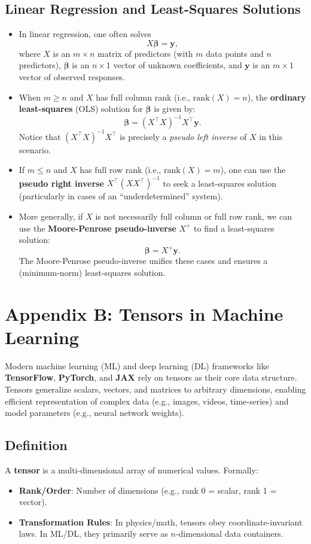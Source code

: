 \documentclass[12pt]{article}
\begin{document}
\subsection*{Linear Regression and Least-Squares Solutions}
\begin{itemize}
    \item In linear regression, one often solves
    \[
        X \boldsymbol{\beta} = \mathbf{y},
    \]
    where $X$ is an $m \times n$ matrix of predictors (with $m$ data points and $n$ predictors), $\boldsymbol{\beta}$ is an $n \times 1$ vector of unknown coefficients, and $\mathbf{y}$ is an $m \times 1$ vector of observed responses.
    \item When $m \ge n$ and $X$ has full column rank (i.e., $\mathrm{rank}(X)=n$), the \textbf{ordinary least-squares} (OLS) solution for $\boldsymbol{\beta}$ is given by:
    \[
        \boldsymbol{\beta} = (X^\top X)^{-1} X^\top \mathbf{y}.
    \]
    Notice that $(X^\top X)^{-1} X^\top$ is precisely a \emph{pseudo left inverse} of $X$ in this scenario.
    \item If $m \le n$ and $X$ has full row rank (i.e., $\mathrm{rank}(X)=m$), one can use the \textbf{pseudo right inverse} $X^\top (X X^\top)^{-1}$ to seek a least-squares solution (particularly in cases of an ``underdetermined'' system). 
    \item More generally, if $X$ is not necessarily full column or full row rank, we can use the \textbf{Moore-Penrose pseudo-inverse} $X^+$ to find a least-squares solution:
    \[
        \boldsymbol{\beta} = X^+ \mathbf{y}.
    \]
    The Moore-Penrose pseudo-inverse unifies these cases and ensures a (minimum-norm) least-squares solution.
\end{itemize}

\newpage
\section*{Appendix B: Tensors in Machine Learning}

Modern machine learning (ML) and deep learning (DL) frameworks like \textbf{TensorFlow}, \textbf{PyTorch}, and \textbf{JAX} rely on tensors as their core data structure. Tensors generalize scalars, vectors, and matrices to arbitrary dimensions, enabling efficient representation of complex data (e.g., images, videos, time-series) and model parameters (e.g., neural network weights).

\subsection*{Definition}
A \textbf{tensor} is a multi-dimensional array of numerical values. Formally:
\begin{itemize}
    \item \textbf{Rank/Order}: Number of dimensions (e.g., rank 0 = scalar, rank 1 = vector).
    \item \textbf{Transformation Rules}: In physics/math, tensors obey coordinate-invariant laws. In ML/DL, they primarily serve as $n$-dimensional data containers.
\end{itemize}
\end{document}
